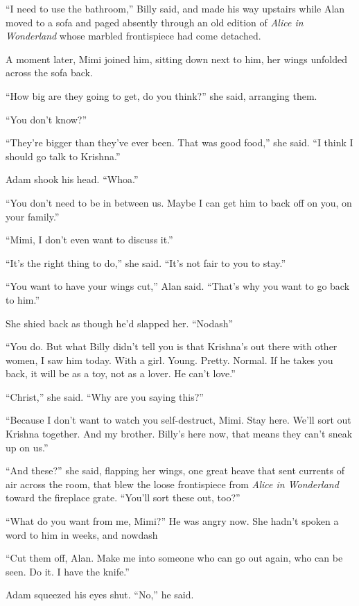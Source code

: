 ``I need to use the bathroom,'' Billy said, and made his way upstairs
while Alan moved to a sofa and paged absently through an old edition
of \textit{Alice in Wonderland} whose marbled frontispiece had come
detached. 

A moment later, Mimi joined him, sitting down next to him, her wings
unfolded across the sofa back.

``How big are they going to get, do you think?'' she said, arranging
them.

``You don't know?''

``They're bigger than they've ever been.  That was good food,'' she
said.  ``I think I should go talk to Krishna.''

Adam shook his head.  ``Whoa.''

``You don't need to be in between us.  Maybe I can get him to back off
on you, on your family.''

``Mimi, I don't even want to discuss it.''

``It's the right thing to do,'' she said.  ``It's not fair to you to
stay.''

``You want to have your wings cut,'' Alan said.  ``That's why you want
to go back to him.''

She shied back as though he'd slapped her.  ``Nodash{}''

``You do.  But what Billy didn't tell you is that Krishna's out there
with other women, I saw him today.  With a girl.  Young.  Pretty. 
Normal.  If he takes you back, it will be as a toy, not as a lover. 
He can't love.''

``Christ,'' she said.  ``Why are you saying this?''

``Because I don't want to watch you self-destruct, Mimi.  Stay here. 
We'll sort out Krishna together.  And my brother.  Billy's here now,
that means they can't sneak up on us.''

``And these?'' she said, flapping her wings, one great heave that sent
currents of air across the room, that blew the loose frontispiece from
\textit{Alice in Wonderland} toward the fireplace grate.  ``You'll
sort these out, too?''

``What do you want from me, Mimi?'' He was angry now.  She hadn't
spoken a word to him in weeks, and nowdash{}

``Cut them off, Alan.  Make me into someone who can go out again, who
can be seen.  Do it.  I have the knife.''

Adam squeezed his eyes shut.  ``No,'' he said. 

